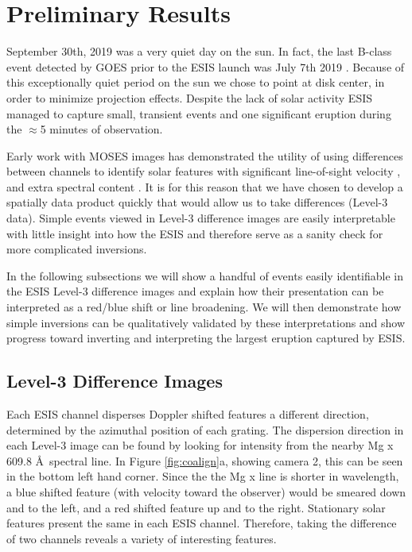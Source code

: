   

\section{Preliminary Results}
	September 30th, 2019 was a very quiet day on the sun.  
	In fact, the last  B-class event detected by GOES \citep{GOES} prior to the ESIS launch was July 7th 2019 .  
	Because of this exceptionally quiet period on the sun we chose to point at disk center, in order to minimize projection effects.  
	Despite the lack of solar activity ESIS managed to capture  small, transient events and one significant eruption during the $\approx$5 minutes of observation.
	
	Early work with MOSES images has demonstrated the utility of using differences between channels to identify solar features with significant line-of-sight velocity \citep{Fox2010,FoxPhD,RustPhD,Rust2019}, and extra spectral content \citep{RustPhD, Rust2019,Parker2021}.  
	It is for this reason that we have chosen to develop a spatially data product quickly that would allow us to take differences (Level-3 data).  
	Simple events viewed in Level-3 difference images are easily interpretable with little insight into how the ESIS and therefore serve as a sanity check for more complicated inversions. 
	
	In the following subsections we will show a handful of events easily identifiable in the ESIS Level-3 difference images and explain how their presentation can be interpreted as a red/blue shift or line broadening.  
	We will then demonstrate how simple inversions can be qualitatively validated by these interpretations and show progress toward inverting and interpreting the largest eruption captured by ESIS.
	
    \subsection{Level-3 Difference Images}
    
    	Each ESIS channel disperses Doppler shifted features a different direction, determined by the azimuthal position of each grating.
    	The dispersion direction in each Level-3 image can be found by looking for intensity from the nearby Mg {\sc x} 609.8 \AA \ spectral line.
    	In Figure \ref{fig:coalign}a, showing camera 2, this can be seen in the bottom left hand corner.  
   		Since the the Mg {\sc x} line is shorter in wavelength, a blue shifted feature (with velocity toward the observer) would be smeared down and to the left, and a red shifted feature up and to the right.	
   		Stationary solar features present the same in each ESIS channel.
   		Therefore, taking the difference of two channels reveals a variety of interesting features.
   		
